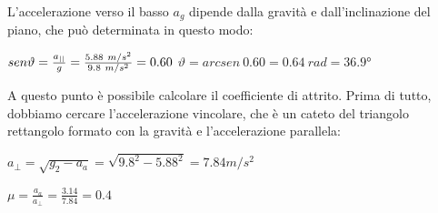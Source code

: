 L'accelerazione verso il basso $a_g$ dipende dalla gravità e dall'inclinazione del piano, che può determinata in questo modo:
\newline

\begin{math}
sen \vartheta = \frac{a_{||}}{g} = \frac{5.88\ m/s^2}{9.8\ m/s^2} = 0.60 \\
\end{math}
\begin{math}
\vartheta = arcsen\ 0.60 = 0.64\ rad = 36.9° 
\end{math}

A questo punto è possibile calcolare il coefficiente di attrito. Prima di tutto, dobbiamo cercare l'accelerazione vincolare, che è un cateto del triangolo rettangolo formato con la gravità e l'accelerazione parallela:\newline

\begin{math}
a_{\perp} = \sqrt{g_2 - a_{a}} = \sqrt{9.8^2 - 5.88^2} = 7.84 m/s^2
\end{math}

\begin{math}
\mu = \frac {a_a}{a_\perp} = \frac{3.14}{7.84} = 0.4
\end{math}
